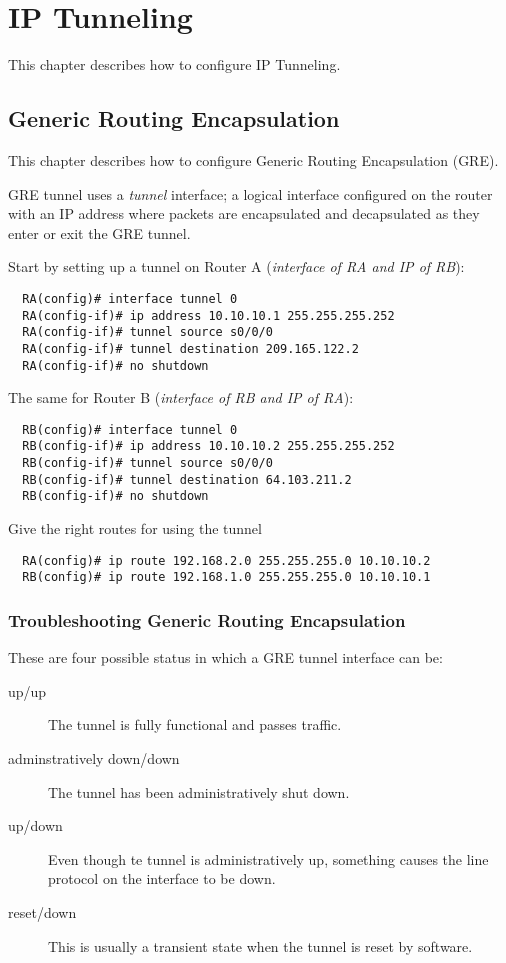\section{IP Tunneling}
This chapter describes how to configure IP Tunneling.
\subsection{Generic Routing Encapsulation}
This chapter describes how to configure Generic Routing Encapsulation (GRE).

GRE tunnel uses a \textit{tunnel} interface; a logical interface configured on
the router with an IP address where packets are encapsulated and decapsulated as
they enter or exit the GRE tunnel.

Start by setting up a tunnel on Router A (\textit{interface of RA and IP of RB}):
\begin{verbatim}
  RA(config)# interface tunnel 0
  RA(config-if)# ip address 10.10.10.1 255.255.255.252
  RA(config-if)# tunnel source s0/0/0
  RA(config-if)# tunnel destination 209.165.122.2
  RA(config-if)# no shutdown
\end{verbatim}

The same for Router B (\textit{interface of RB and IP of RA}):
\begin{verbatim}
  RB(config)# interface tunnel 0
  RB(config-if)# ip address 10.10.10.2 255.255.255.252
  RB(config-if)# tunnel source s0/0/0
  RB(config-if)# tunnel destination 64.103.211.2
  RB(config-if)# no shutdown
\end{verbatim}

Give the right routes for using the tunnel
\begin{verbatim}
  RA(config)# ip route 192.168.2.0 255.255.255.0 10.10.10.2
  RB(config)# ip route 192.168.1.0 255.255.255.0 10.10.10.1
\end{verbatim}

\subsubsection{Troubleshooting Generic Routing Encapsulation}
These are four possible status in which a GRE tunnel interface can be:
\begin{description}
  \item[up/up] The tunnel is fully functional and passes traffic.
  \item[adminstratively down/down] The tunnel has been administratively shut down.
  \item[up/down] Even though te tunnel is administratively up, something causes the line protocol on the interface to be down.
  \item[reset/down] This is usually a transient state when the tunnel is reset by software.
\end{description}

